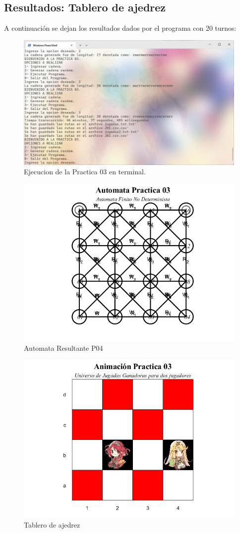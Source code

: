 \documentclass{article}
\begin{document}
    \subsection{Resultados: Tablero de ajedrez}
    A continuación se dejan los resultados dados por el programa con 20 turnos:

    \begin{figure}[H]
        \centering
        \includegraphics[width=0.75\linewidth]{TerminalP03.png}
        \caption{Ejecucion de la Practica 03 en terminal.}\label{terminalP03}
    \end{figure}

    \begin{figure}[H]
        \centering
        \includegraphics[width=0.6\linewidth]{automataP03.png}
        \caption{Automata Resultante P04}\label{automataP03}
    \end{figure}

    \begin{figure}[H]
        \centering
        \includegraphics[width=0.6\linewidth]{tablero.png}
        \caption{Tablero de ajedrez}\label{tablero}
    \end{figure}
\end{document}
